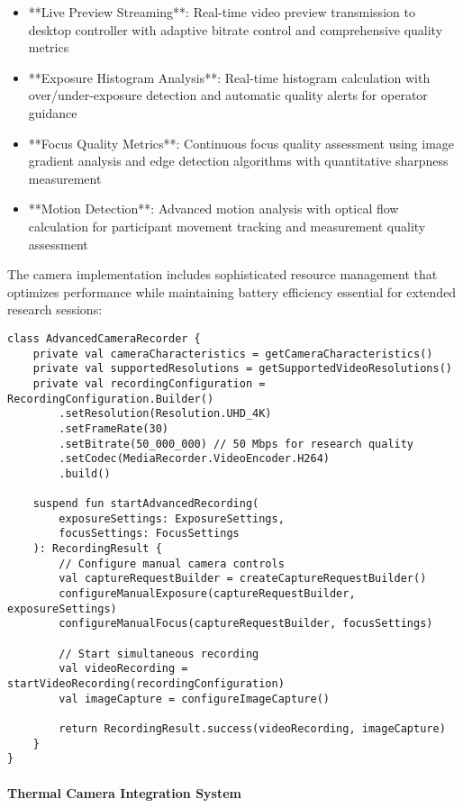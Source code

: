 \documentclass[12pt,a4paper]{report}
\begin{document}
\begin{itemize}
\item **Live Preview Streaming**: Real-time video preview transmission to desktop controller with adaptive bitrate control
  and comprehensive quality metrics
\item **Exposure Histogram Analysis**: Real-time histogram calculation with over/under-exposure detection and automatic
  quality alerts for operator guidance
\item **Focus Quality Metrics**: Continuous focus quality assessment using image gradient analysis and edge detection
  algorithms with quantitative sharpness measurement
\item **Motion Detection**: Advanced motion analysis with optical flow calculation for participant movement tracking and
  measurement quality assessment

\end{itemize}
The camera implementation includes sophisticated resource management that optimizes performance while maintaining
battery efficiency essential for extended research sessions:

\begin{verbatim}
class AdvancedCameraRecorder {
    private val cameraCharacteristics = getCameraCharacteristics()
    private val supportedResolutions = getSupportedVideoResolutions()
    private val recordingConfiguration = RecordingConfiguration.Builder()
        .setResolution(Resolution.UHD_4K)
        .setFrameRate(30)
        .setBitrate(50_000_000) // 50 Mbps for research quality
        .setCodec(MediaRecorder.VideoEncoder.H264)
        .build()

    suspend fun startAdvancedRecording(
        exposureSettings: ExposureSettings,
        focusSettings: FocusSettings
    ): RecordingResult {
        // Configure manual camera controls
        val captureRequestBuilder = createCaptureRequestBuilder()
        configureManualExposure(captureRequestBuilder, exposureSettings)
        configureManualFocus(captureRequestBuilder, focusSettings)

        // Start simultaneous recording
        val videoRecording = startVideoRecording(recordingConfiguration)
        val imageCapture = configureImageCapture()

        return RecordingResult.success(videoRecording, imageCapture)
    }
}
\end{verbatim}

\paragraph{Thermal Camera Integration System}
\end{document}

